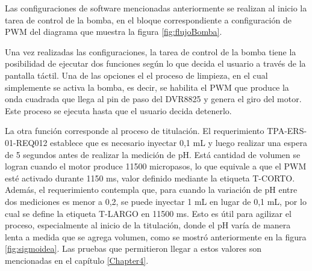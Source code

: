 Las configuraciones de software mencionadas anteriormente se realizan al inicio la tarea de control de la bomba, en el bloque correspondiente a configuración de PWM del diagrama que muestra la figura \ref{fig:flujoBomba}.

Una vez realizadas las configuraciones, la tarea de control de la bomba tiene la posibilidad de ejecutar dos funciones según lo que decida el usuario a través de la pantalla táctil. Una de las opciones el el proceso de limpieza, en el cual simplemente se activa la bomba, es decir, se habilita el PWM que produce la onda cuadrada que llega al pin de paso del DVR8825 y genera el giro del motor. Este proceso se ejecuta hasta que el usuario decida detenerlo.

La otra función corresponde al proceso de titulación. El requerimiento TPA-ERS-01-REQ012 establece que es necesario inyectar 0,1 mL y luego realizar una espera de 5 segundos antes de realizar la medición de pH. Está cantidad de volumen se logran cuando el motor produce 11500 micropasos, lo que equivale a que el PWM esté activado durante 1150 ms, valor definido mediante la etiqueta T-CORTO. Además, el requerimiento contempla que, para cuando la variación de pH entre dos mediciones  es menor a 0,2, se puede inyectar 1 mL en lugar de 0,1 mL, por lo cual se define la etiqueta T-LARGO en 11500 ms. Esto es útil para agilizar el proceso, especialmente al inicio de la titulación, donde el pH varía de manera lenta a medida que se agrega volumen, como se mostró anteriormente en la figura \ref{fig:sigmoidea}. Las pruebas que permitieron llegar a estos valores son mencionadas en el capítulo \ref{Chapter4}.

